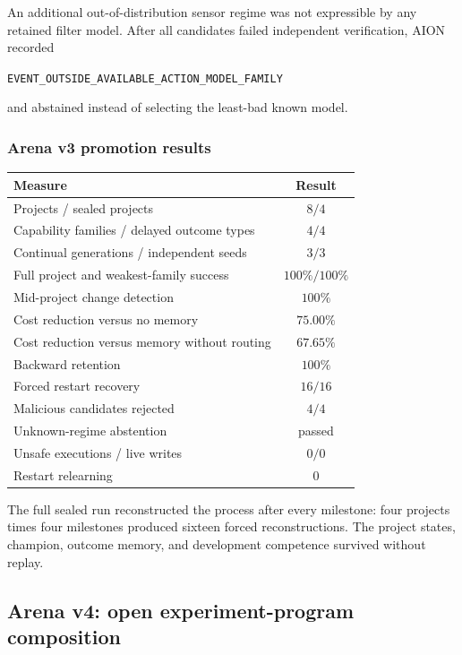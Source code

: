 An additional out-of-distribution sensor regime was not expressible by any
retained filter model.  After all candidates failed independent verification,
AION recorded
\begin{center}
\texttt{EVENT\_OUTSIDE\_AVAILABLE\_ACTION\_MODEL\_FAMILY}
\end{center}
and abstained instead of selecting the least-bad known model.


\subsubsection{Arena v3 promotion results}

\begin{center}
\small
\begin{tabular}{|>{\raggedright\arraybackslash}p{6.6cm}|c|}
\hline
\textbf{Measure} & \textbf{Result} \\
\hline
Projects / sealed projects & $8/4$ \\
Capability families / delayed outcome types & $4/4$ \\
Continual generations / independent seeds & $3/3$ \\
Full project and weakest-family success & $100\%/100\%$ \\
Mid-project change detection & $100\%$ \\
Cost reduction versus no memory & $75.00\%$ \\
Cost reduction versus memory without routing & $67.65\%$ \\
Backward retention & $100\%$ \\
Forced restart recovery & $16/16$ \\
Malicious candidates rejected & $4/4$ \\
Unknown-regime abstention & passed \\
Unsafe executions / live writes & $0/0$ \\
Restart relearning & $0$ \\
\hline
\end{tabular}
\end{center}

The full sealed run reconstructed the process after every milestone: four
projects times four milestones produced sixteen forced reconstructions.  The
project states, champion, outcome memory, and development competence survived
without replay.


\subsection{Arena v4: open experiment-program composition}
\label{subsec:arena-v4}

